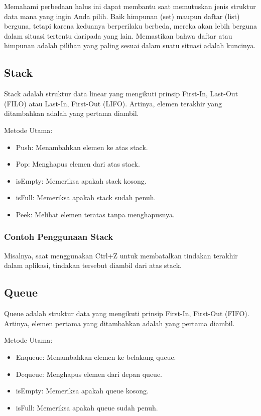 \documentclass{article}
\begin{document}
Memahami perbedaan halus ini dapat membantu saat memutuskan jenis struktur data mana yang ingin Anda pilih. Baik himpunan (set) maupun daftar (list) berguna, tetapi karena keduanya berperilaku berbeda, mereka akan lebih berguna dalam situasi tertentu daripada yang lain. Memastikan bahwa daftar atau himpunan adalah pilihan yang paling sesuai dalam suatu situasi adalah kuncinya.

\subsection{Stack}
Stack adalah struktur data linear yang mengikuti prinsip First-In, Last-Out (FILO) atau Last-In, First-Out (LIFO). Artinya, elemen terakhir yang ditambahkan adalah yang pertama diambil.

Metode Utama:
\begin{itemize}
    \item Push: Menambahkan elemen ke atas stack.
    \item Pop: Menghapus elemen dari atas stack.
    \item isEmpty: Memeriksa apakah stack kosong.
    \item isFull: Memeriksa apakah stack sudah penuh.
    \item Peek: Melihat elemen teratas tanpa menghapusnya.
\end{itemize}

\subsubsection{Contoh Penggunaan Stack}
Misalnya,  saat menggunakan Ctrl+Z untuk membatalkan tindakan terakhir dalam aplikasi, tindakan tersebut diambil dari atas stack.

\subsection{Queue}
Queue adalah struktur data yang mengikuti prinsip First-In, First-Out (FIFO). Artinya, elemen pertama yang ditambahkan adalah yang pertama diambil.

Metode Utama:
\begin{itemize}
    \item Enqueue: Menambahkan elemen ke belakang queue.
    \item Dequeue: Menghapus elemen dari depan queue.
    \item isEmpty: Memeriksa apakah queue kosong.
    \item isFull: Memeriksa apakah queue sudah penuh.
\end{itemize}
\end{document}
